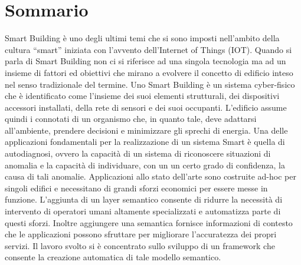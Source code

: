 \chapter*{Sommario}
Smart Building è uno degli ultimi temi che si sono imposti nell'ambito della cultura ``smart'' iniziata con l'avvento dell'Internet of Things (IOT). Quando si parla di Smart Building non ci si riferisce ad una singola tecnologia ma ad un insieme di fattori ed obiettivi che mirano a evolvere il concetto di edificio inteso nel senso tradizionale del termine. Uno Smart Building è un sistema cyber-fisico che è identificato come l'insieme dei suoi elementi strutturali, dei dispositivi accessori installati, della rete di sensori e dei suoi occupanti. L'edificio assume quindi i connotati di un organismo che, in quanto tale, deve adattarsi all'ambiente, prendere decisioni e minimizzare gli sprechi di energia. Una delle applicazioni fondamentali per la realizzazione di un sistema Smart è quella di autodiagnosi, ovvero la capacità di un sistema di riconoscere situazioni di anomalia e la capacità di individuare, con un un certo grado di confidenza, la causa di tali anomalie. Applicazioni allo stato dell'arte sono costruite ad-hoc per singoli edifici e necessitano di grandi sforzi economici per essere messe in funzione. L'aggiunta di un layer semantico consente di ridurre la necessità di intervento di operatori umani altamente specializzati e automatizza parte di questi sforzi. Inoltre aggiungere una semantica fornisce informazioni di contesto che le applicazioni possono sfruttare per migliorare l'accuratezza dei propri servizi. Il lavoro svolto si è concentrato sullo sviluppo di un framework che consente la creazione automatica di tale modello semantico.
